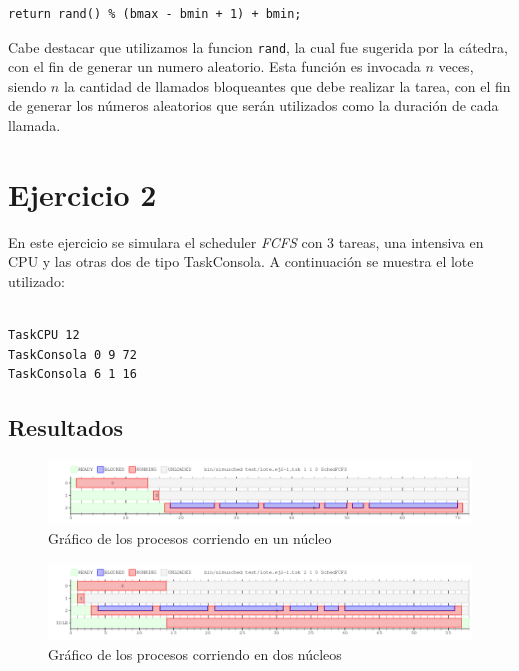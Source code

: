 \documentclass[a4paper]{article}
\begin{document}
\begin{verbatim}
return rand() % (bmax - bmin + 1) + bmin;
\end{verbatim}

Cabe destacar que utilizamos la funcion \verb|rand|, la cual fue sugerida
por la cátedra, con el fin de generar un numero aleatorio. Esta función es
invocada $n$ veces, siendo $n$ la cantidad de llamados bloqueantes que debe
realizar la tarea, con el fin de generar los números aleatorios que serán
utilizados como la duración de cada llamada.

\section{Ejercicio 2}
En este ejercicio se simulara el scheduler \textit{FCFS} con 3 tareas, una 
intensiva en CPU y las otras dos de tipo TaskConsola. A continuación se
muestra el lote utilizado:
\begin{verbatim}

TaskCPU 12
TaskConsola 0 9 72
TaskConsola 6 1 16

\end{verbatim}

\subsection{Resultados}

\begin{figure}[htb]
\begin{center}
\includegraphics[scale=0.4]{imagenes/ej2-1-c-1.png}
\end{center}
\caption{Gráfico de los procesos corriendo en un núcleo}
\end{figure}

\begin{figure}[htb]
\begin{center}
\includegraphics[scale=0.4]{imagenes/ej2-1-c-2.png}
\end{center}
\caption{Gráfico de los procesos corriendo en dos núcleos}
\end{figure}
\end{document}
